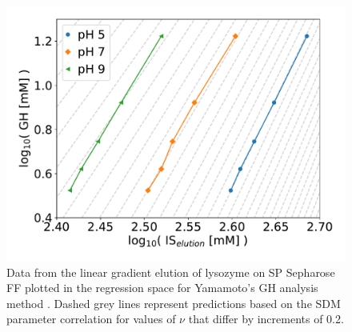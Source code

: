 \documentclass[11pt,a4paper]{article}
\begin{document}
\begin{figure}[htbp]
            \centering
            \includegraphics[width=\textwidth]{my_lge_data}
            \caption{
            Data from the linear gradient elution of lysozyme on SP Sepharose FF plotted in the regression space for Yamamoto's GH analysis method \cite{main-Yamamoto1987}. Dashed grey lines represent predictions based on the SDM parameter correlation for values of $\nu$ that differ by increments of 0.2.
            }
            \label{fig:lge overlay}
\end{figure}
\end{document}
